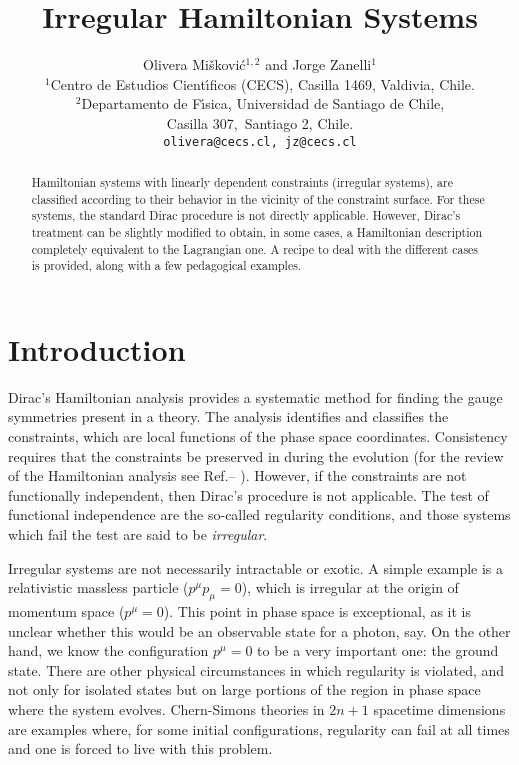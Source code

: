 \documentclass[a4paper,thmsa,11pt]{article}
\begin{document}
\title{Irregular Hamiltonian Systems}

\author{Olivera Mi\v {s}kovi\'{c}$^{1,2}$ and Jorge Zanelli$^{1}$\\[2mm]
$^{1}$Centro de Estudios Cient\'{\i }ficos (CECS), Casilla
1469, Valdivia, Chile.\\ $^{2}$Departamento de F\'{\i }sica,
Universidad de Santiago de Chile,\\ Casilla 307,\ Santiago 2, Chile.
\\[2mm]
\texttt{olivera@cecs.cl, jz@cecs.cl}}
\date{}
\maketitle

\begin{abstract}
Hamiltonian systems with linearly dependent constraints (irregular
systems), are classified according to their behavior in the vicinity of the
constraint surface. For these systems, the standard Dirac procedure is not
directly applicable. However, Dirac's treatment can be slightly modified to
obtain, in some cases, a Hamiltonian description completely equivalent to
the Lagrangian one. A recipe to deal with the different cases is provided,
along with a few pedagogical examples.
\end{abstract}


\section{Introduction}

Dirac's Hamiltonian analysis provides a systematic method for finding the
gauge symmetries present in a theory. The analysis identifies and classifies
the constraints, which are local functions of the phase space coordinates.
Consistency requires that the constraints be preserved in during the
evolution (for the review of the Hamiltonian analysis see Ref.\cite{Dirac}--%
\cite{Chitaia-Gogilidze-Surovtsev}). However, if the constraints are not
functionally independent, then Dirac's procedure is not applicable. The test
of functional independence are the so-called regularity conditions, and
those systems which fail the test are said to be \emph{irregular}.

Irregular systems are not necessarily intractable or exotic. A simple
example is a relativistic massless particle ($p^{\mu }p_{\mu }=0$), which is
irregular at the origin of momentum space ($p^{\mu }=0$). This point in
phase space is exceptional, as it is unclear whether this would be an
observable state for a photon, say. On the other hand, we know the
configuration $p^{\mu }=0$ to be a very important one: the ground state.
There are other physical circumstances in which regularity is violated, and
not only for isolated states but on large portions of the region in phase
space where the system evolves. Chern-Simons theories in $2n+1$ spacetime
dimensions are examples where, for some initial configurations, regularity
can fail at all times and one is forced to live with this problem.
\end{document}
